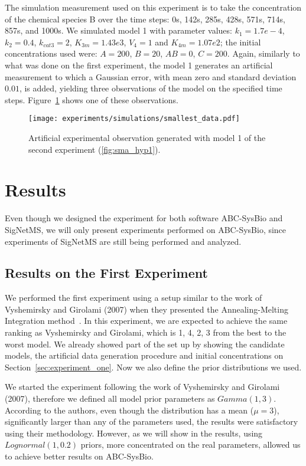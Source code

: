 The simulation measurement used on this experiment is to take the 
concentration of the chemical species B over the time steps: 0s, 142s,
285s, 428s, 571s, 714s, 857s, and 1000s. We simulated model 1 with 
parameter values: $k_1 = 1.7e-4$, $k_2 = 0.4$, $k_{cat3} = 2$, 
$K_{3m} = 1.43e3$, $V_4 = 1$ and $K_{4m} = 1.07e2$; the initial 
concentrations used were: $A = 200$, $B = 20$, $AB = 0$, $C = 200$.
Again, similarly to what was done on the first experiment, the model 1
generates an artificial measurement to which a Gaussian error, with 
mean zero and standard deviation $0.01$, is added, yielding three 
observations of the model on the specified time steps. 
Figure~\ref{fig:sma_simulation} shows one of these observations.


\begin{figure}
    \begin{center}
    \texttt{[image: experiments/simulations/smallest\_data.pdf]}
    \caption{Artificial experimental observation generated with model 1 
        of the second experiment (\ref{fig:sma_hyp1}).}
    \label{fig:sma_simulation}
    \end{center}
\end{figure}


\section{Results}

Even though we designed the experiment for both software ABC-SysBio and
SigNetMS, we will only present experiments performed on ABC-SysBio, 
since experiments of SigNetMS are still being performed and analyzed.


\subsection{Results on the First Experiment}
We performed the first experiment using a setup similar to the work of
Vyshemirsky and Girolami (2007) when they presented the 
Annealing-Melting Integration method~\cite{Vyshemirsky2007}. 
In this experiment, we are expected to achieve the same ranking as 
Vyshemirsky and Girolami, which is 1, 4, 2, 3 from the best to the worst 
model. We already showed part of the set up by showing the candidate 
models, the artificial data generation procedure and initial 
concentrations on Section~\ref{sec:experiment_one}. Now we also define 
the prior distributions we used. 

We started the experiment following the work of Vyshemirsky and Girolami
(2007), therefore we defined all model prior parameters as 
$Gamma (1, 3)$. According to the authors, even though the distribution 
has a mean ($\mu = 3$), significantly larger than any of the parameters
used, the results were satisfactory using their methodology. However,
as we will show in the results, using $Lognormal (1, 0.2)$ priors, more 
concentrated on the real parameters, allowed us to achieve better 
results on ABC-SysBio. 


